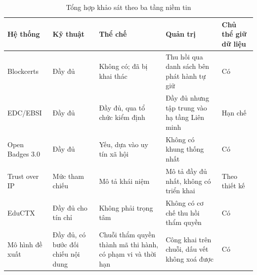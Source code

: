 \begin{table}[H]
\centering
\caption{Tổng hợp khảo sát theo ba tầng niềm tin}
\label{tab:v2-survey}
\renewcommand{\arraystretch}{1.25}
\small
\begin{tabular}{|p{2.2cm}|p{2.6cm}|p{3.4cm}|p{3.4cm}|p{1.6cm}|}
\hline
\textbf{Hệ thống} & \textbf{Kỹ thuật} & \textbf{Thể chế} & \textbf{Quản trị} & \textbf{Chủ thể giữ dữ liệu} \\ \hline
Blockcerts & Đầy đủ & Không có; đã bị khai thác \cite{Baldi2019} & Thu hồi qua danh sách bên phát hành tự giữ & Có \\ \hline
EDC/EBSI & Đầy đủ & Đầy đủ, qua tổ chức kiểm định & Đầy đủ nhưng tập trung vào hạ tầng Liên minh & Hạn chế \\ \hline
Open Badges 3.0 & Đầy đủ & Yếu, dựa vào uy tín xã hội & Không có khung thống nhất & Có \\ \hline
Trust over IP & Mức tham chiếu & Mô tả khái niệm & Mô tả đầy đủ nhất, không có triển khai & Theo thiết kế \\ \hline
EduCTX & Đầy đủ cho tín chỉ & Không phải trọng tâm & Không có cơ chế thu hồi thẩm quyền & Có \\ \hline
Mô hình đề xuất & Đầy đủ, có bước đối chiếu nội dung & Chuỗi thẩm quyền thành mã thi hành, có phạm vi và thời hạn & Công khai trên chuỗi, dấu vết không xoá được & Có \\ \hline
\end{tabular}
\end{table}
